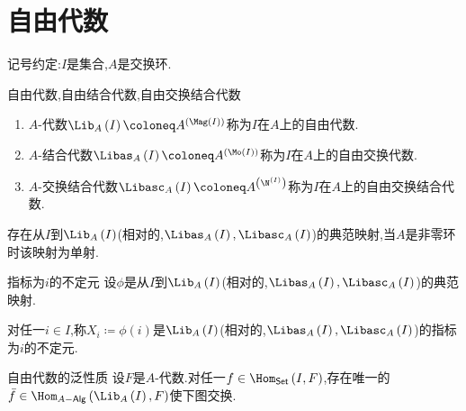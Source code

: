 \section{自由代数}

记号约定:$I$是集合,$A$是交换环.

\begin{definition}{自由代数,自由结合代数,自由交换结合代数}{}
	\begin{enumerate}
		\item $A$-代数$\Lib_{A}\left(I\right)\coloneq A^{\left(\Mag\left(I\right)\right)}$称为$I$在$A$上的自由代数.
		\item $A$-结合代数$\Libas_{A}\left(I\right)\coloneq A^{\left(\Mo\left(I\right)\right)}$称为$I$在$A$上的自由交换代数.
		\item $A$-交换结合代数$\Libasc_{A}\left(I\right)\coloneq A^{\left(\N^{\left(I\right)}\right)}$称为$I$在$A$上的自由交换结合代数.
	\end{enumerate}
\end{definition}

\begin{proposition}{}{}
	存在从$I$到$\Lib_{A}\left(I\right)$(相对的,$\Libas_{A}\left(I\right),\Libasc_{A}\left(I\right)$)的典范映射,当$A$是非零环时该映射为单射.
\end{proposition}

\begin{definition}{指标为$i$的不定元}{}
	设$\phi$是从$I$到$\Lib_{A}\left(I\right)$(相对的,$\Libas_{A}\left(I\right),\Libasc_{A}\left(I\right)$)的典范映射.
	
	对任一$i\in I$,称$X_{i}\coloneq\phi\left(i\right)$是$\Lib_{A}\left(I\right)$(相对的,$\Libas_{A}\left(I\right),\Libasc_{A}\left(I\right)$)的指标为$i$的不定元.
\end{definition}

\begin{proposition}{自由代数的泛性质}{}
	设$F$是$A$-代数.对任一$f\in\Hom_{\mathsf{Set}}\left(I,F\right)$,存在唯一的$\bar{f}\in\Hom_{A-\mathsf{Alg}}\left(\Lib_{A}\left(I\right),F\right)$使下图交换.
	\begin{center}
	\end{center}
\end{proposition}

